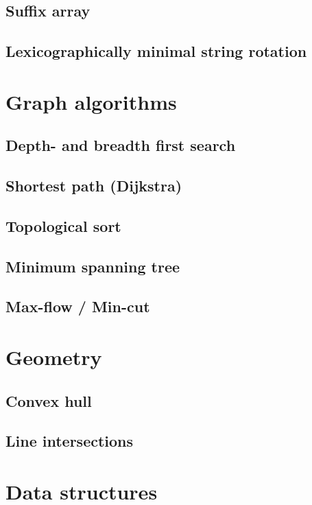 \documentclass[a4paper,10pt]{article}
\begin{document}
\subsection{Suffix array}

\subsection{Lexicographically minimal string rotation}

\newpage
\section{Graph algorithms}
\subsection{Depth- and breadth first search}

\subsection{Shortest path (Dijkstra)}

\subsection{Topological sort}
\subsection{Minimum spanning tree}
\subsection{Max-flow / Min-cut}


\newpage
\section{Geometry}
\subsection{Convex hull}

\subsection{Line intersections}

\newpage
\section{Data structures}
\end{document}
